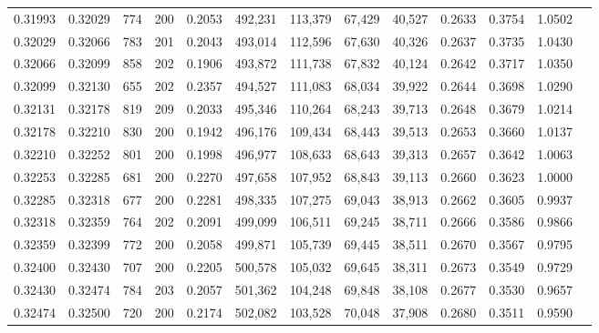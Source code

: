 \begin{tabular}{rrrrrrrrrrrrr}
0.31993 & 0.32029 &   774 & 200 &                                     0.2053 & 492,231 & 113,379 &  67,429 &  40,527 & 0.2633 & 0.3754 & 1.0502 \\
0.32029 & 0.32066 &   783 & 201 &                                     0.2043 & 493,014 & 112,596 &  67,630 &  40,326 & 0.2637 & 0.3735 & 1.0430 \\
0.32066 & 0.32099 &   858 & 202 &                                     0.1906 & 493,872 & 111,738 &  67,832 &  40,124 & 0.2642 & 0.3717 & 1.0350 \\
0.32099 & 0.32130 &   655 & 202 &                                     0.2357 & 494,527 & 111,083 &  68,034 &  39,922 & 0.2644 & 0.3698 & 1.0290 \\
0.32131 & 0.32178 &   819 & 209 &                                     0.2033 & 495,346 & 110,264 &  68,243 &  39,713 & 0.2648 & 0.3679 & 1.0214 \\
0.32178 & 0.32210 &   830 & 200 &                                     0.1942 & 496,176 & 109,434 &  68,443 &  39,513 & 0.2653 & 0.3660 & 1.0137 \\
0.32210 & 0.32252 &   801 & 200 &                                     0.1998 & 496,977 & 108,633 &  68,643 &  39,313 & 0.2657 & 0.3642 & 1.0063 \\
0.32253 & 0.32285 &   681 & 200 &                                     0.2270 & 497,658 & 107,952 &  68,843 &  39,113 & 0.2660 & 0.3623 & 1.0000 \\
0.32285 & 0.32318 &   677 & 200 &                                     0.2281 & 498,335 & 107,275 &  69,043 &  38,913 & 0.2662 & 0.3605 & 0.9937 \\
0.32318 & 0.32359 &   764 & 202 &                                     0.2091 & 499,099 & 106,511 &  69,245 &  38,711 & 0.2666 & 0.3586 & 0.9866 \\
0.32359 & 0.32399 &   772 & 200 &                                     0.2058 & 499,871 & 105,739 &  69,445 &  38,511 & 0.2670 & 0.3567 & 0.9795 \\
0.32400 & 0.32430 &   707 & 200 &                                     0.2205 & 500,578 & 105,032 &  69,645 &  38,311 & 0.2673 & 0.3549 & 0.9729 \\
0.32430 & 0.32474 &   784 & 203 &                                     0.2057 & 501,362 & 104,248 &  69,848 &  38,108 & 0.2677 & 0.3530 & 0.9657 \\
0.32474 & 0.32500 &   720 & 200 &                                     0.2174 & 502,082 & 103,528 &  70,048 &  37,908 & 0.2680 & 0.3511 & 0.9590 \\

\end{tabular}
